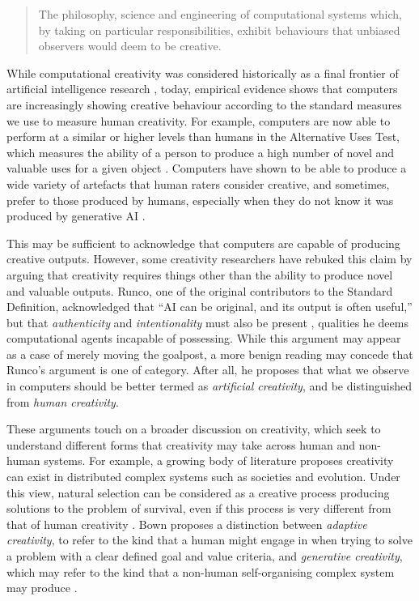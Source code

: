 \begin{quote}
The philosophy, science and engineering of computational systems which, by taking on particular responsibilities, exhibit behaviours that unbiased observers would deem to be creative.
\end{quote}

While computational creativity was considered historically as a final frontier of artificial intelligence research \cite{Colton2021-bt}, today, empirical evidence shows that computers are increasingly showing creative behaviour according to the standard measures we use to measure human creativity. For example, computers are now able to perform at a similar or higher levels than humans in the Alternative Uses Test, which measures the ability of a person to produce a high number of novel and valuable uses for a given object \cite{Hubert2024-kv, Guzik2023-cl}. Computers have shown to be able to produce a wide variety of artefacts that human raters consider creative, and sometimes, prefer to those produced by humans, especially when they do not know it was produced by generative AI \cite{Alexander2024-pz, Wu2025-or, Kobis2021-bb}. 

This may be sufficient to acknowledge that computers are capable of producing creative outputs. However, some creativity researchers have rebuked this claim by arguing that creativity requires things other than the ability to produce novel and valuable outputs. Runco, one of the original contributors to the Standard Definition, acknowledged that “AI can be original, and its output is often useful,” but that \emph{authenticity} and \emph{intentionality} must also be present \cite{Runco2025-bu}, qualities he deems computational agents incapable of possessing. While this argument may appear as a case of merely moving the goalpost, a more benign reading may concede that Runco's argument is one of category. After all, he proposes that what we observe in computers should be better termed as \textit{artificial creativity}, and be distinguished from \textit{human creativity}. 

These arguments touch on a broader discussion on creativity, which seek to understand different forms that creativity may take across human and non-human systems. For example, a growing body of literature proposes creativity can exist in distributed complex systems such as societies and evolution. Under this view, natural selection can be considered as a creative process producing solutions to the problem of survival, even if this process is very different from that of human creativity \cite{Wagner2015-oj}. Bown proposes a distinction between \textit{adaptive creativity}, to refer to the kind that a human might engage in when trying to solve a problem with a clear defined goal and value criteria, and \textit{generative creativity}, which may refer to the kind that a non-human self-organising complex system may produce \cite{Bown2012-gg}. 

